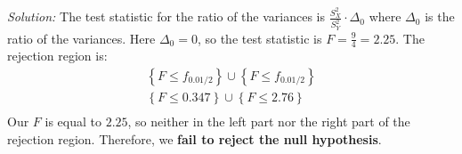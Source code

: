 \documentclass{tufte-handout}
\begin{document}

\textit{Solution:} The test statistic for the ratio of the variances is $\frac{S_X^2}{S_Y^2} \cdot \Delta_0$
where $\Delta_0$ is the ratio of the variances. Here $\Delta_0 = 0$, so the test statistic
is $F = \frac{9}{4}=2.25$. The rejection region is:
\begin{align*}
\left\{F \leq f_{0.01/2} \right\} \cup \left\{F \leq f_{0.01/2} \right\} \\
\left\{F \leq 0.347 \right\} \cup \left\{F \leq 2.76 \right\} \\
\end{align*}
Our $F$ is equal to $2.25$, so neither in the left part nor the right part of the 
rejection region. Therefore, we \textbf{fail to reject the null hypothesis}.
\end{document}
